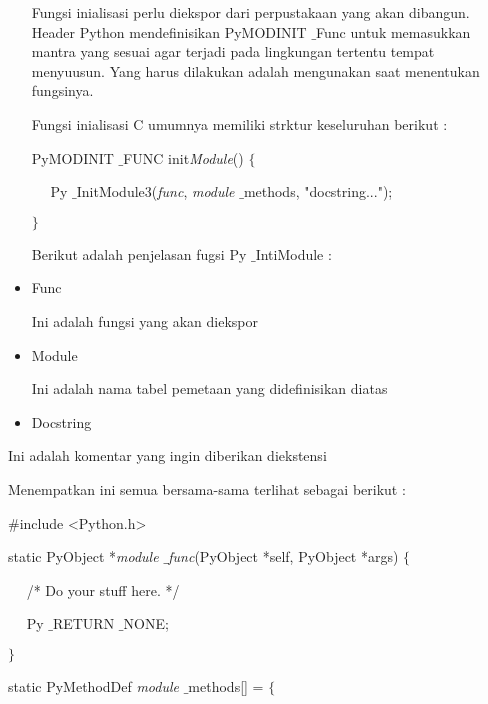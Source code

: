 \begin{itemize}
\noindent 
 \hspace*{0.5in} Fungsi inialisasi perlu diekspor dari perpustakaan yang akan dibangun. Header Python mendefinisikan PyMODINIT $  \_  $Func untuk memasukkan mantra yang sesuai agar terjadi pada lingkungan tertentu tempat menyuusun. Yang harus dilakukan adalah mengunakan saat menentukan fungsinya. \par
\noindent 
 \hspace*{0.5in} Fungsi inialisasi C umumnya memiliki strktur keseluruhan berikut : \par
\noindent 
PyMODINIT $  \_  $FUNC init\textit{Module}()  $  \{  $ \par
\noindent 
~~ Py $  \_  $InitModule3(\textit{func}, \textit{module} $  \_  $methods, "docstring..."); \par
\noindent 
 $  \}  $ \par
\vspace{12pt}
\noindent 
Berikut adalah penjelasan fugsi Py $  \_  $IntiModule : \par
\noindent 
\item Func  \par
\noindent 
Ini adalah fungsi yang akan diekspor \par
\noindent 
\item Module \par
\noindent 
Ini adalah nama tabel pemetaan yang didefinisikan diatas \par
\noindent 
\item Docstring\end{itemize}
 \par
\noindent 
Ini adalah komentar yang ingin diberikan diekstensi \par
\vspace{12pt}
\noindent 
 \hspace*{0.5in} Menempatkan ini semua bersama-sama terlihat sebagai berikut : \par
\noindent 
 $  \#  $include <Python.h> \par
\vspace{12pt}
\noindent 
static PyObject *\textit{module $  \_  $func}(PyObject *self, PyObject *args)  $  \{  $ \par
\noindent 
~~ /* Do your stuff here. */ \par
\noindent 
~~ Py $  \_  $RETURN $  \_  $NONE; \par
\noindent 
 $  \}  $ \par
\vspace{12pt}
\noindent 
static PyMethodDef \textit{module} $  \_  $methods[] =  $  \{  $ \par
